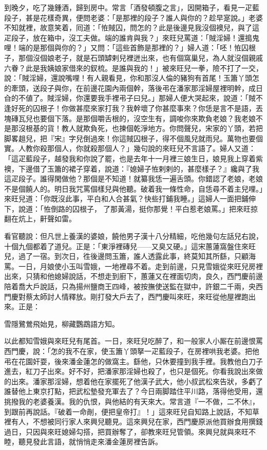 到晚夕，吃了幾鍾酒，歸到房中。常言「酒發頓腹之言」，因開箱子，看見一疋藍段子，甚是花樣奇異，便問老婆：「是那裡的段子？誰人與你的？趁早寔說。」老婆不知就裡，故意笑着，囘道：「恠賊囚，問怎的？此是後邊見我沒個襖兒，與了這疋段子，放在箱中，沒工夫做。端的誰肯與我？」來旺兒罵道：「賊淫婦！還搗鬼哩！端的是那個與你的？」又問：「這些首飾是那裡的？」婦人道：「呸！恠囚根子，那個沒個娘老子，就是石頭罅剌兒裡迸出來，也有個窩巢兒，為人就沒個親戚六眷？此是我姨娘家借來的釵梳。是誰與我的！」被來旺兒一拳，險不打了一交，{}說：「賊淫婦，還說嘴哩！有人親看見，你和那沒人倫的豬狗有首尾！玉簫丫頭怎的牽頭，送段子與你，在前邊花園內兩個幹，落後弔在潘家那淫婦屋裡明幹，成日㒲的不値了。賊淫婦，你還要我手裡弔子曰兒。」那婦人便大哭起來，說道：「賊不逢好死的囚根子！你做甚麼來家打我？我幹壞了你甚麼事來？你恁是言不是語，丟塊磚瓦兒也要個下落。是那個嚼舌根的，沒空生有，調唆你來欺負老娘？{}我老娘不是那沒根基的貨！教人就欺負死，也揀個乾淨地方。你問聲兒，宋家的丫頭，若把脚畧趄兒，把『宋』字兒倒過來！你這賊囚根子，得不個風兒就雨兒。萬物也要個實。人教你殺那個人，你就殺那個人？」幾句說的來旺兒不言語了。婦人又道：「這疋藍段子，越發我和你說了罷，也是去年十一月裡三娘生日，娘見我上穿着紫襖，下邊借了玉簫的裙子穿着，說道：『媳婦子恠剌剌的，甚麼樣子？』纔與了我這疋段子。誰得閑做他？那個是不知道！就纂我恁一遍舌頭。你錯認了老娘，老娘不是個饒人的。明日我咒罵個樣兒與他聽。破着我一條性命，自恁尋不着主兒哩。」{}來旺兒道：「你既沒此事，{}平白和人合甚氣？{}快些打鋪我睡。」這婦人一面把鋪伸下，說道：「恠倒路的囚根子，𠳹了那黃湯，挺你那覺！平白惹老娘罵。」把來旺掠翻在炕上，鼾聲如雷。

看官聽說：但凡世上養漢的婆娘，饒他男子漢十八分精細，吃他幾句左話兒右說，十個九個都着了道兒。正是：「東淨裡磚兒——又臭又硬。」這宋蕙蓮窩盤住來旺兒，過了一宿。到次日，徃後邊問玉簫，誰人透露此事，終莫知其所繇，只顧海罵。一日，月娘使小玉叫雪娥，一地裡尋不着。走到前邊，只見雪娥從來旺兒房裡出來，只猜和他媳婦說話，不想走到廚下，蕙蓮又在裡面切肉，良久，西門慶前邊陪着喬大戶說話，只為揚州鹽商王四峰，被按撫使送監在獄中，許銀二千兩，央西門慶對蔡太師討人情釋放。剛打發大戶去了，西門慶叫來旺，來旺從他屋裡跑出來。正是：

\begin{myquote}
雪隱鷺鶯飛始見，柳藏鸚鵡語方知。
\end{myquote}

以此都知雪娥與來旺兒有尾首。一日，來旺兒吃醉了，和一般家人小厮在前邊恨罵西門慶，說：「怎的我不在家，使玉簫丫頭拏一疋藍段子，在房裡哄我老婆。把他弔在花園奸耍，後來潘金蓮怎的做窩主。繇他，只休要撞到我手裡。我教他白刀子進去，紅刀子出來。好不好，把潘家那淫婦也殺了，也只是個死。你看我說出來做的出來。潘家那淫婦，想着他在家擺死了他漢子武大，他小叔武松來告狀，多虧了誰替他上東京打點，把武松墊發充軍去了？今日兩脚踏住平川路，落得他受用，還挑撥我的老婆養漢。我的仇恨，與他結的有天來大。常言道『一不做，二不休』，到跟前再說話。『破着一命剮，便把皇帝打』！」{}這來旺兒自知路上說話，不知草裡有人，不想被同行家人來興兒聽見。這來興兒在家，西門慶原派他買辦食用撰錢過日，只因與來旺媳婦勾搭，把買辦奪了，卻教來旺兒管領。來興兒就與來旺不睦，聽見發此言語，就悄悄走來潘金蓮房裡告訴。

